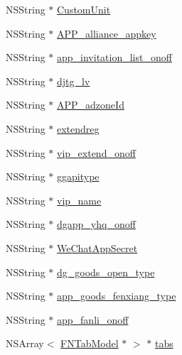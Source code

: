 \begin{DoxyCompactItemize}
\item 
N\+S\+String $\ast$ \mbox{\hyperlink{interface_f_n_base_setting_model_a576656fdd2b2d71f946eac7683feebcf}{Custom\+Unit}}
\item 
N\+S\+String $\ast$ \mbox{\hyperlink{interface_f_n_base_setting_model_a740c75efc15eb3aad501cd8643fd4681}{A\+P\+P\+\_\+alliance\+\_\+appkey}}
\item 
N\+S\+String $\ast$ \mbox{\hyperlink{interface_f_n_base_setting_model_a075c2b73089a3a461289d9e3506aebb4}{app\+\_\+invitation\+\_\+list\+\_\+onoff}}
\item 
N\+S\+String $\ast$ \mbox{\hyperlink{interface_f_n_base_setting_model_aef74a52b0cecb129373a1b0e5c396ffe}{djtg\+\_\+lv}}
\item 
N\+S\+String $\ast$ \mbox{\hyperlink{interface_f_n_base_setting_model_ac5ad8a28b339fde53a05e27defdd446c}{A\+P\+P\+\_\+adzone\+Id}}
\item 
N\+S\+String $\ast$ \mbox{\hyperlink{interface_f_n_base_setting_model_ae110bcfc0eaaa1b6a1fcfbd08d8128f4}{extendreg}}
\item 
N\+S\+String $\ast$ \mbox{\hyperlink{interface_f_n_base_setting_model_a0d0b0671b46fcef684d8dfaeeb7ef1e2}{vip\+\_\+extend\+\_\+onoff}}
\item 
N\+S\+String $\ast$ \mbox{\hyperlink{interface_f_n_base_setting_model_a0cc963f0dd795432de7b4f8dee1f17fd}{ggapitype}}
\item 
N\+S\+String $\ast$ \mbox{\hyperlink{interface_f_n_base_setting_model_ad3de59496d78e73eb382bc27f770df88}{vip\+\_\+name}}
\item 
N\+S\+String $\ast$ \mbox{\hyperlink{interface_f_n_base_setting_model_a0b3eb1d94c8141dae4c17ca2cc3027a3}{dgapp\+\_\+yhq\+\_\+onoff}}
\item 
N\+S\+String $\ast$ \mbox{\hyperlink{interface_f_n_base_setting_model_a08230c600d21427a3d2aa561ad6edeee}{We\+Chat\+App\+Secret}}
\item 
N\+S\+String $\ast$ \mbox{\hyperlink{interface_f_n_base_setting_model_ac16e28237e0681d8a70a8052279a75ca}{dg\+\_\+goods\+\_\+open\+\_\+type}}
\item 
N\+S\+String $\ast$ \mbox{\hyperlink{interface_f_n_base_setting_model_aaea8dbc04b062e37c72a620e800acebc}{app\+\_\+goods\+\_\+fenxiang\+\_\+type}}
\item 
N\+S\+String $\ast$ \mbox{\hyperlink{interface_f_n_base_setting_model_a9e78b80ce394a77d5f61746c1394cfd7}{app\+\_\+fanli\+\_\+onoff}}
\item 
N\+S\+Array$<$ \mbox{\hyperlink{interface_f_n_tab_model}{F\+N\+Tab\+Model}} $\ast$ $>$ $\ast$ \mbox{\hyperlink{interface_f_n_base_setting_model_a6a53991e078eac3bbe976d467c974b06}{tabs}}

\end{DoxyCompactItemize}
